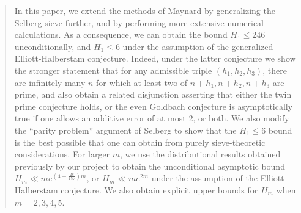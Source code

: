 \documentclass{bmcart}
\theoremstyle{plain}
\theoremstyle{definition}
\begin{document}
\begin{frontmatter}
\begin{abstractbox}
\begin{abstract}
  In this paper, we extend the methods of Maynard by generalizing the Selberg sieve further, and by performing more extensive numerical calculations. As a consequence, we can obtain the bound $H_1 \leq 246$ unconditionally, and $H_1 \leq 6$ under the assumption of the generalized Elliott-Halberstam conjecture. Indeed, under the latter conjecture we show the stronger statement that for any admissible triple $(h_1,h_2,h_3)$, there are infinitely many $n$ for which at least two of $n+h_1,n+h_2,n+h_3$ are prime, and also obtain a related disjunction asserting that either the twin prime conjecture holds, or the even Goldbach conjecture is asymptotically true if one allows an additive error of at most $2$, or both. We also modify the ``parity problem'' argument of Selberg to show that the $H_1 \leq 6$ bound is the best possible that one can obtain from purely sieve-theoretic considerations. For larger $m$, we use the distributional results obtained previously by our project to obtain the unconditional asymptotic bound $H_m \ll m e^{(4-\frac{28}{157})m}$, or $H_m \ll m e^{2m}$ under the assumption of the Elliott-Halberstam conjecture. We also obtain explicit upper bounds for $H_m$ when $m=2,3,4,5$.
	\end{abstract}

\begin{keyword}
\end{keyword}


\end{abstractbox}
%

\end{frontmatter}

\end{document}

